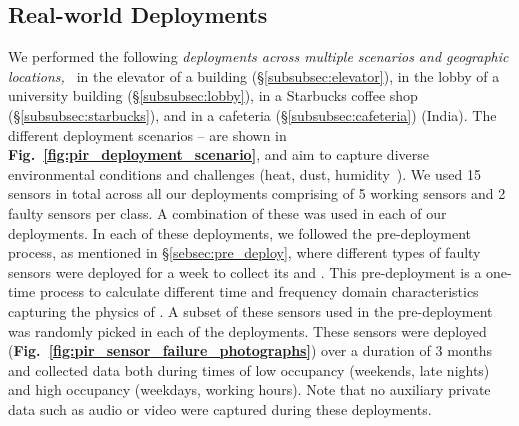 

\subsection{Real-world Deployments}
\label{subsec:deployment}


We performed the following \emph{deployments across multiple scenarios and geographic locations,~\viz}  
\ca in the elevator of a building (\S\ref{subsubsec:elevator}), 
\cb in the lobby of a university building (\S\ref{subsubsec:lobby}), \cc in a Starbucks coffee shop (\S\ref{subsubsec:starbucks}), and \cd in a cafeteria (\S\ref{subsubsec:cafeteria}) (India).
The different deployment scenarios \ca -- \cc are shown in {\bfseries Fig.~\ref{fig:pir_deployment_scenario}}, and aim to capture diverse environmental conditions and challenges (heat, dust, humidity~\etc). 
%
%
We used 15 sensors in total across all our deployments comprising of 5 working sensors and 2 faulty sensors per class. A combination of these was used in each of our deployments. In each of these deployments, we followed the pre-deployment process, as mentioned in \S\ref{sebsec:pre_deploy}, where different types of faulty sensors were deployed for a week to collect its \aout and \cout. This pre-deployment is a one-time process to calculate different time and frequency domain characteristics capturing the physics of \aout. A subset of these sensors used in the pre-deployment was randomly picked in each of the deployments.
These sensors were deployed (\textbf{Fig.~\ref{fig:pir_sensor_failure_photographs}}) %
over a duration of 3 months and collected data both during times of low occupancy (weekends, late nights) and high occupancy (weekdays, working hours). Note that no auxiliary private data such as audio or video were captured during these deployments. 

